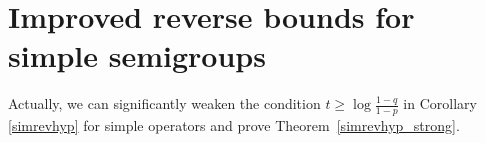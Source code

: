 \documentclass[11pt]{amsart}
\newcommand{\E}{\mathbb{E}}
\newcommand{\1}{\mathbf{1}}
\def\E{{\mathbb E}}
\def\H{{\mathcal{H}}}
\theoremstyle{definition}
\theoremstyle{plain}
\newtheorem{proposition}[example]{Proposition}
\theoremstyle{remark}
\numberwithin{equation}{section}
\begin{document}
\section{Improved reverse bounds for simple semigroups}

Actually, we can significantly weaken the condition
$t \geq \log \frac{1-q}{1-p}$ in Corollary \ref{simrevhyp} for simple operators and prove Theorem~\ref{simrevhyp_strong}.

\end{document}
